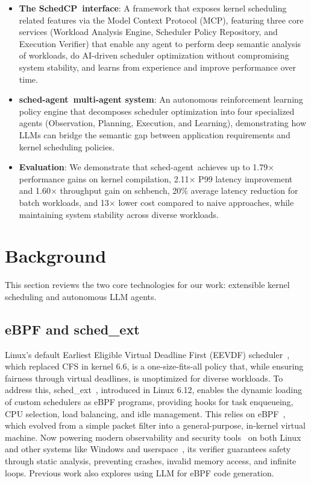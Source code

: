 \documentclass[preprint]{article}
\newcommand{\sys}{SchedCP\xspace}
\newcommand{\agent}{sched-agent\xspace}
\begin{document}
\begin{itemize}
    \item \textbf{The \sys\ interface}: A framework that exposes kernel scheduling related features via the Model Context Protocol (MCP), featuring three core services (Workload Analysis Engine, Scheduler Policy Repository, and Execution Verifier) that enable any agent to perform deep semantic analysis of workloads, do AI-driven scheduler optimization without compromising system stability, and learns from experience and improve performance over time.
    \item \textbf{\agent\ multi-agent system}: An autonomous reinforcement learning policy engine that decomposes scheduler optimization into four specialized agents (Observation, Planning, Execution, and Learning), demonstrating how LLMs can bridge the semantic gap between application requirements and kernel scheduling policies.
    \item \textbf{Evaluation}: We demonstrate that \agent\ achieves up to 1.79× performance gains on kernel compilation, 2.11× P99 latency improvement and 1.60× throughput gain on schbench, 20\% average latency reduction for batch workloads, and 13× lower cost compared to naive approaches, while maintaining system stability across diverse workloads.
\end{itemize}

\section{Background}
\label{sec:background}

This section reviews the two core technologies for our work: extensible kernel scheduling and autonomous LLM agents.

\subsection{eBPF and sched\_ext}

Linux's default Earliest Eligible Virtual Deadline First (EEVDF) scheduler~\cite{eevdf2024}, which replaced CFS in kernel 6.6, is a one-size-fits-all policy that, while ensuring fairness through virtual deadlines, is unoptimized for diverse workloads. To address this, sched\_ext~\cite{schedext2024}, introduced in Linux 6.12, enables the dynamic loading of custom schedulers as eBPF programs, providing hooks for task enqueueing, CPU selection, load balancing, and idle management. This relies on eBPF~\cite{ebpfio}, which evolved from a simple packet filter into a general-purpose, in-kernel virtual machine. Now powering modern observability and security tools~\cite{tracee,cilium} on both Linux and other systems like Windows and userspace~\cite{zheng2025extending, windows-ebpf}, its verifier guarantees safety through static analysis, preventing crashes, invalid memory access, and infinite loops. Previous work also explores using LLM for eBPF code generation\cite{kgent}.
\end{document}
